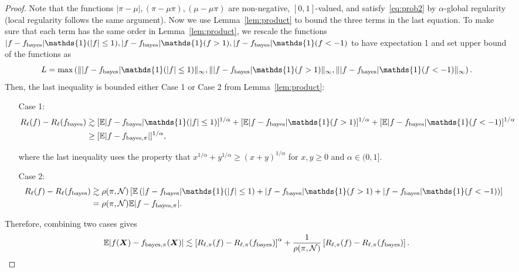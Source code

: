 \documentclass[11pt]{article}
\theoremstyle{plain}
\theoremstyle{definition}
\def\bayesf{f_{\textup{bayes}}}
\def\bayespif{f_{\textup{bayes},\pi}}
\begin{document}
\begin{proof}
Note that the functions $|\pi-\mu|, (\pi-\mu\pi), (\mu-\mu\pi)$ are non-negative, $[0,1]$-valued, and satisfy~\eqref{eq:prob2} by $\alpha$-global regularity (local regularity follows the same argument).  Now we use Lemma~\ref{lem:product} to bound the three terms in the last equation.  To make sure that each term has the same order in Lemma~\ref{lem:product},  we rescale the functions $|f-\bayesf|\mathds{1}(|f|\leq1),|f-\bayesf|\mathds{1}(f>1),|f-\bayesf|\mathds{1}(f<-1)$ to have expectation 1 and set upper bound of the functions as \[L = \max\left(\mnormSize{}{|f-\bayesf|\mathds{1}(|f|\leq1)},\mnormSize{}{|f-\bayesf|\mathds{1}(f>1)},\mnormSize{}{|f-\bayesf|\mathds{1}(f<-1)}\right).\]
Then,  the last inequality is bounded either Case 1 or Case 2 from Lemma~\ref{lem:product}:
\begin{enumerate}[label={2.\arabic*},wide, labelwidth=!, labelindent=0pt]
\item[Case 1:]
\begin{align}
R_\ell(f)-R_\ell(\bayesf)  &\gtrsim [\mathbb{E} |f-\bayesf|\mathds{1}(|f|\leq 1)]^{1/\alpha}+ [\mathbb{E}|f-\bayesf|\mathds{1}(f>1)]^{1/\alpha}
+[ \mathbb{E}|f-\bayesf|\mathds{1}(f<-1)]^{1/\alpha}\\
&\geq  [\mathbb{E}|f-\bayespif|]^{1/\alpha},
\end{align}

where the last inequality uses the property that $x^{1/\alpha}+y^{1/\alpha}\geq (x+y)^{1/\alpha}$ for $x,y\geq 0$ and $\alpha\in(0,1]$.
\item[Case 2:]
\begin{align}
R_\ell(f)-R_\ell(\bayesf)  &\gtrsim \rho(\pi,\tN)\left[\mathbb{E} \left(|f-\bayesf|\mathds{1}(|f|\leq 1)+|f-\bayesf|\mathds{1}(f>1)+|f-\bayesf|\mathds{1}(f<-1)\right)\right]\\
&= \rho(\pi,\tN) \mathbb{E}|f-\bayespif|.
\end{align}
\end{enumerate}
Therefore, combining two cases gives
\begin{equation}
\mathbb{E}|f(\mX)-\bayespif(\mX)|
\lesssim
\left[R_{\ell,\pi}(f)-R_{\ell,\pi}(\bayesf)\right]^{\alpha}+
 {1\over \rho(\pi, \tN)}\left[R_{\ell,\pi}(f)-R_{\ell,\pi}(\bayesf)\right].
\end{equation}
\end{proof}
\end{document}
